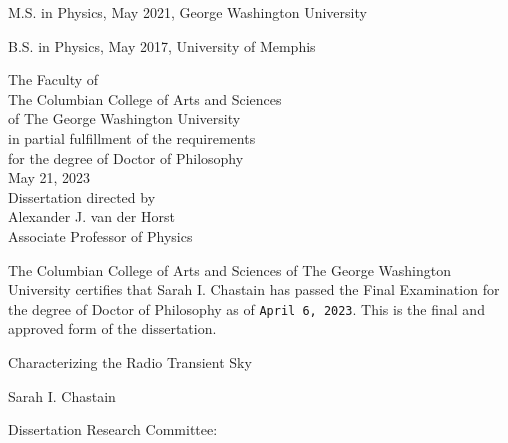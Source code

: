 \documentclass[12pt]{article}
\begin{document}
\thispagestyle{empty}
\vspace*{45pt}
\begin{center}
\centerline{M.S. in Physics, May 2021, George Washington University}
\centerline{B.S. in Physics, May 2017, University of Memphis}\vspace*{24pt}
\begin{center}
The Faculty of\\The Columbian College of Arts and Sciences \\ of The George
Washington University\\ in partial fulfillment of the requirements\\ for the degree
of Doctor of Philosophy\\[36pt]\vspace*{12pt}
May 21, 2023\\[36pt] %
Dissertation directed by\\[\baselineskip]
Alexander J. van der Horst\\
Associate Professor of Physics\\[\baselineskip]
\end{center}
\end{center}
\pagestyle{plain}
\setcounter{page}{1}
\newpage
\begin{doublespace}
\noindent
The Columbian College of Arts and Sciences of The George Washington University certifies that Sarah I. Chastain has passed the Final Examination for the degree of Doctor of Philosophy as of \texttt{April 6, 2023}. This is the final and approved form of the dissertation.
\end{doublespace}
\vspace*{24pt}
\begin{center}
Characterizing the Radio Transient Sky

\vspace*{36pt}
Sarah I. Chastain
\vspace*{36pt}
\end{center}
Dissertation Research Committee:
\vspace{12pt}
\end{document}
